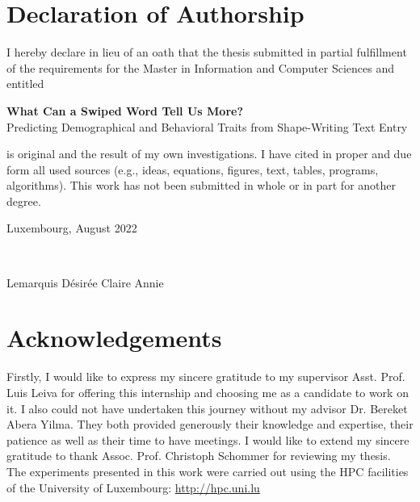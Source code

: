 \documentclass[11pt,oneside,a4paper,openright]{book}
\begin{document}

\newpage\null\thispagestyle{empty}\newpage

\chapter*{Declaration of Authorship}

I hereby declare in lieu of an oath that the thesis submitted in partial fulfillment of the requirements for the Master in Information and Computer Sciences and entitled\newline

{\bfseries What Can a Swiped Word Tell Us More?}\\{Predicting Demographical and Behavioral Traits from Shape-Writing Text Entry}\newline

is original and the result of my own investigations. I have cited in proper and due form all used sources (e.g., ideas, equations, figures, text, tables, programs, algorithms). This work has not been submitted in whole or in part for another degree.\newline\newline

\begin{flushright}Luxembourg, August 2022\end{flushright}\\
\begin{flushright}Lemarquis Désirée Claire Annie\end{flushright}


\large
\chapter*{Acknowledgements}
Firstly, I would like to express my sincere gratitude to my supervisor Asst. Prof. Luis Leiva for offering this internship and choosing me as a candidate to work on it. I also could not have undertaken this journey without my advisor Dr. Bereket Abera Yilma. They both provided generously their knowledge and expertise, their patience as well as their time to have meetings. I would like to extend my sincere gratitude to thank Assoc. Prof. Christoph Schommer for reviewing my thesis.\\

The experiments presented in this work were carried out
using the HPC facilities of the University of Luxembourg: \url{http://hpc.uni.lu}\\
\end{document}
